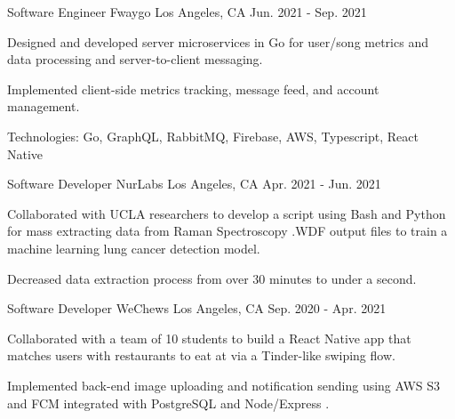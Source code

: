 

\begin{cventries}

\cventry
    {Software Engineer} %
    {Fwaygo} %
    {Los Angeles, CA} %
    {Jun. 2021 - Sep. 2021} %
    {
      \begin{cvitems} %
        \item {Designed and developed server microservices in Go for user/song
        metrics and data processing and server-to-client messaging.}
        \item {Implemented client-side metrics tracking, message feed, and
        account management.}
        \item {Technologies: Go, GraphQL, RabbitMQ, Firebase, AWS, Typescript,
        React Native}
      \end{cvitems}
    }

\cventry
    {Software Developer} %
    {NurLabs} %
    {Los Angeles, CA} %
    {Apr. 2021 - Jun. 2021} %
    {
      \begin{cvitems} %
        \item {Collaborated with UCLA researchers to develop a script using Bash
        and Python for mass extracting data from Raman Spectroscopy .WDF output
        files to train a machine learning lung cancer detection model.}
        \item {Decreased data extraction process from over 30 minutes to under a
        second.}
      \end{cvitems}
    }

\cventry
    {Software Developer} %
    {WeChews} %
    {Los Angeles, CA} %
    {Sep. 2020 - Apr. 2021} %
    {
      \begin{cvitems} %
        \item {Collaborated with a team of 10 students to build a React Native
        app that matches users with restaurants to eat at via a Tinder-like
        swiping flow.}
        \item {Implemented back-end image uploading and notification sending
        using AWS S3 and FCM integrated with PostgreSQL and Node/Express .}
      \end{cvitems}
    }
\end{cventries}
